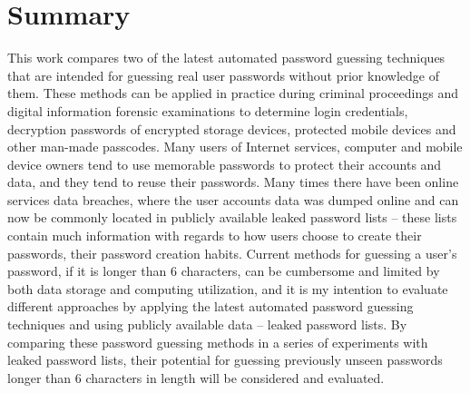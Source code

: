 \documentclass{VUMIFInfBakalaurinis}
\begin{document}
\section{Summary}
This work compares two of the latest automated password guessing techniques that 
are intended for guessing real user passwords without prior knowledge of them. 
These methods can be applied in practice during criminal proceedings and digital 
information forensic examinations to determine login credentials, decryption 
passwords of encrypted storage devices, protected mobile devices and other 
man-made passcodes. Many users of Internet services, computer and mobile device 
owners tend to use memorable passwords to protect their accounts and data, and 
they tend to reuse their passwords. Many times there have been online services 
data breaches, where the user accounts data was dumped online and can now be 
commonly located in publicly available leaked password lists -- these lists 
contain much information with regards to how users choose to create their 
passwords, their password creation habits. Current methods for guessing a user's 
password, if it is longer than 6 characters, can be cumbersome and limited
by both data storage and computing utilization, and it is my intention to 
evaluate different approaches by applying the latest automated password guessing 
techniques and using publicly available data -- leaked password lists. By 
comparing these password guessing methods in a series of experiments with leaked 
password lists, their potential for guessing previously unseen passwords longer 
than 6 characters in length will be considered and evaluated.
\end{document}
